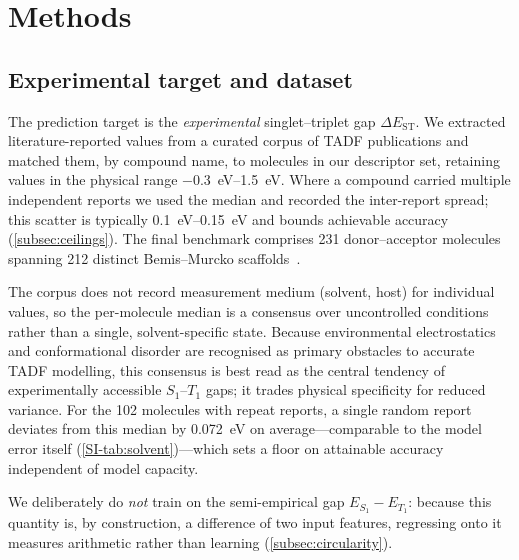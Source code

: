
\section{Methods}\label{sec:methods}

\subsection{Experimental target and dataset}\label{para:validation_hierarchy}

The prediction target is the \emph{experimental} singlet--triplet gap
$\Delta E_\text{ST}$. We extracted literature-reported values from a curated
corpus of TADF publications and matched them, by compound name, to molecules in
our descriptor set, retaining values in the physical range
\qtyrange{-0.3}{1.5}{\electronvolt}. Where a compound carried multiple independent
reports we used the median and recorded the inter-report spread; this scatter is
typically \qtyrange{0.1}{0.15}{\electronvolt} and bounds achievable accuracy
(\cref{subsec:ceilings}). The final benchmark comprises \num{231} donor--acceptor
molecules spanning \num{212} distinct Bemis--Murcko scaffolds~\cite{Bemis1996}.

The corpus does not record measurement medium (solvent, host) for individual
values, so the per-molecule median is a consensus over uncontrolled conditions
rather than a single, solvent-specific state. Because environmental electrostatics
and conformational disorder are recognised as primary obstacles to accurate TADF
modelling,\cite{Olivier2017} this consensus is best read as the central tendency of
experimentally accessible $S_1$--$T_1$ gaps; it trades physical specificity for
reduced variance. For the \num{102} molecules with repeat reports, a single random
report deviates from this median by \qty{0.072}{\electronvolt} on
average---comparable to the model error itself
(\cref{SI-tab:solvent})---which sets a floor on attainable accuracy independent of
model capacity.

We deliberately do \emph{not} train on the semi-empirical gap
$E_{S_1}-E_{T_1}$: because this quantity is, by construction, a difference of two
input features, regressing onto it measures arithmetic rather than learning
(\cref{subsec:circularity}).

